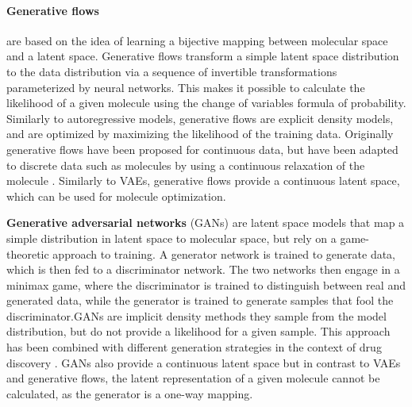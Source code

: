 \paragraph{Generative flows} \citep{rezendeVariationalInferenceNormalizing2016} are based on the
idea of learning a bijective mapping between molecular space and a latent space. Generative flows
transform a simple latent space distribution to the data distribution via a sequence of invertible
transformations parameterized by neural networks. This makes it possible to calculate the likelihood
of a given molecule using the change of variables formula of probability. Similarly to
autoregressive models, generative flows are explicit density models, and are optimized by maximizing
the likelihood of the training data. Originally generative flows have been proposed for continuous
data, but have been adapted to discrete data such as molecules by using a continuous relaxation of
the molecule \citep{madhawaGraphNVPInvertibleFlow2019}. Similarly to VAEs, generative flows provide
a continuous latent space, which can be used for molecule optimization.

\textbf{Generative adversarial networks} (GANs) \citep{goodfellowGenerativeAdversarialNetworks2014}
are latent space models that map a simple distribution in latent space to molecular space, but rely
on a game-theoretic approach to training. A generator network is trained to generate data, which is
then fed to a discriminator network. The two networks then engage in a minimax game, where the
discriminator is trained to distinguish between real and generated data, while the generator is
trained to generate samples that fool the discriminator.\@ GANs are implicit density methods they
sample from the model distribution, but do not provide a likelihood for a given sample. This
approach has been combined with different generation strategies in the context of drug discovery
\citep{decaoMolGANImplicitGenerative2018,kadurinDruGANAdvancedGenerative2017,guimaraesObjectiveReinforcedGenerativeAdversarial2017,mendez-lucioNovoGenerationHitlike2018,tangMolecularGenerativeAdversarial2024}.
GANs also provide a continuous latent space but in contrast to VAEs and generative flows, the latent
representation of a given molecule cannot be calculated, as the generator is a one-way mapping.

